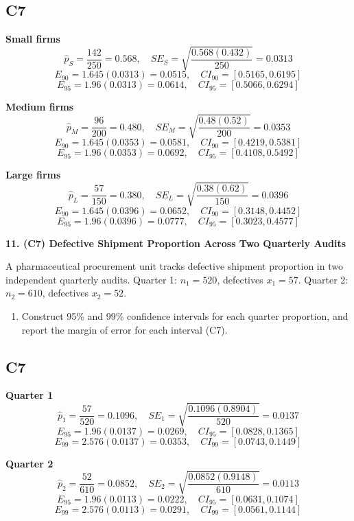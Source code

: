 \begin{ExamProblems}
		\subsection*{C7}
		\textbf{Small firms}
		\[
		\hat{p}_S=\frac{142}{250}=0.568,
		\quad SE_S=\sqrt{\frac{0.568(0.432)}{250}}=0.0313
		\]
		\[
		E_{90}=1.645(0.0313)=0.0515,\quad CI_{90}=[0.5165,0.6195]
		\]
		\[
		E_{95}=1.96(0.0313)=0.0614,\quad CI_{95}=[0.5066,0.6294]
		\]
		
		\textbf{Medium firms}
		\[
		\hat{p}_M=\frac{96}{200}=0.480,
		\quad SE_M=\sqrt{\frac{0.48(0.52)}{200}}=0.0353
		\]
		\[
		E_{90}=1.645(0.0353)=0.0581,\quad CI_{90}=[0.4219,0.5381]
		\]
		\[
		E_{95}=1.96(0.0353)=0.0692,\quad CI_{95}=[0.4108,0.5492]
		\]
		
		\textbf{Large firms}
		\[
		\hat{p}_L=\frac{57}{150}=0.380,
		\quad SE_L=\sqrt{\frac{0.38(0.62)}{150}}=0.0396
		\]
		\[
		E_{90}=1.645(0.0396)=0.0652,\quad CI_{90}=[0.3148,0.4452]
		\]
		\[
		E_{95}=1.96(0.0396)=0.0777,\quad CI_{95}=[0.3023,0.4577]
		\]
		
		\newpage
		\item
		\textbf{11. (C7) Defective Shipment Proportion Across Two Quarterly Audits}
		
		A pharmaceutical procurement unit tracks defective shipment proportion in two independent quarterly audits.
		Quarter 1: $n_1=520$, defectives $x_1=57$.
		Quarter 2: $n_2=610$, defectives $x_2=52$.
		\begin{enumerate}
			\item Construct 95\% and 99\% confidence intervals for each quarter proportion, and report the margin of error for each interval (C7).
		\end{enumerate}
		
		\subsection*{C7}
		\textbf{Quarter 1}
		\[
		\hat{p}_1=\frac{57}{520}=0.1096,
		\quad SE_1=\sqrt{\frac{0.1096(0.8904)}{520}}=0.0137
		\]
		\[
		E_{95}=1.96(0.0137)=0.0269,\quad CI_{95}=[0.0828,0.1365]
		\]
		\[
		E_{99}=2.576(0.0137)=0.0353,\quad CI_{99}=[0.0743,0.1449]
		\]
		
		\textbf{Quarter 2}
		\[
		\hat{p}_2=\frac{52}{610}=0.0852,
		\quad SE_2=\sqrt{\frac{0.0852(0.9148)}{610}}=0.0113
		\]
		\[
		E_{95}=1.96(0.0113)=0.0222,\quad CI_{95}=[0.0631,0.1074]
		\]
		\[
		E_{99}=2.576(0.0113)=0.0291,\quad CI_{99}=[0.0561,0.1144]
		\]
		

\end{ExamProblems}
